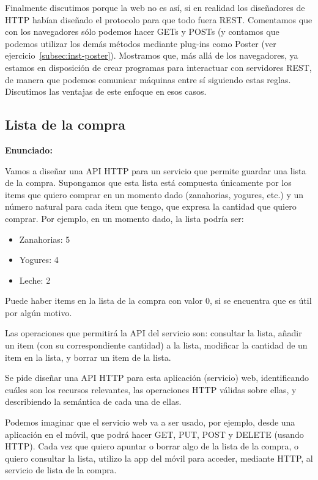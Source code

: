 Finalmente discutimos porque la web no es así, si en realidad los diseñadores de HTTP habían diseñado el protocolo para que todo fuera REST. Comentamos que con los navegadores sólo podemos hacer GETs y POSTs (y contamos que podemos utilizar los demás métodos mediante plug-ins como Poster (ver ejercicio~\ref{subsec:inst-poster}). Mostramos que, más allá de los navegadores, ya estamos en disposición de crear programas para interactuar con servidores REST, de manera que podemos comunicar máquinas entre sí siguiendo estas reglas. Discutimos las ventajas de este enfoque en esos casos.


\subsection{Lista de la compra}
\label{subsec:lista-compra}

\textbf{Enunciado:}

Vamos a diseñar una API HTTP para un servicio que permite guardar una lista de la compra. Supongamos que esta lista está compuesta únicamente por los items que quiero comprar en un momento dado (zanahorias, yogures, etc.) y un número natural para cada item que tengo, que expresa la cantidad que quiero comprar. Por ejemplo, en un momento dado, la lista podría ser:

\begin{itemize}
\item Zanahorias: 5
\item Yogures: 4
\item Leche: 2
\end{itemize}

Puede haber items en la lista de la compra con valor 0, si se encuentra que es útil por algún motivo.

Las operaciones que permitirá la API del servicio son: consultar la lista, añadir un item (con su correspondiente cantidad) a la lista, modificar la cantidad de un item en la lista, y borrar un item de la lista.

Se pide diseñar una API HTTP para esta aplicación (servicio) web, identificando cuáles son los recursos relevantes, las operaciones HTTP válidas sobre ellas, y describiendo la semántica de cada una de ellas.

Podemos imaginar que el servicio web va a ser usado, por ejemplo, desde una aplicación en el móvil, que podrá hacer GET, PUT, POST y DELETE (usando HTTP). Cada vez que quiero apuntar o borrar algo de la lista de la compra, o quiero consultar la lista, utilizo la app del móvil para acceder, mediante HTTP, al servicio de lista de la compra.

